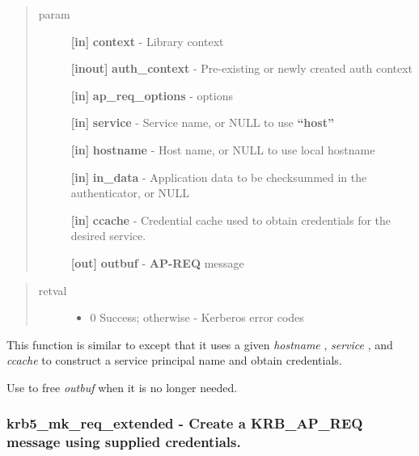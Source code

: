 \documentclass[letterpaper,10pt,english]{sphinxmanual}
\begin{document}
\begin{quote}\begin{description}
\item[{param}] \leavevmode
\textbf{{[}in{]}} \textbf{context} - Library context

\textbf{{[}inout{]}} \textbf{auth\_context} - Pre-existing or newly created auth context

\textbf{{[}in{]}} \textbf{ap\_req\_options} -  options

\textbf{{[}in{]}} \textbf{service} - Service name, or NULL to use \textbf{``host''}

\textbf{{[}in{]}} \textbf{hostname} - Host name, or NULL to use local hostname

\textbf{{[}in{]}} \textbf{in\_data} - Application data to be checksummed in the authenticator, or NULL

\textbf{{[}in{]}} \textbf{ccache} - Credential cache used to obtain credentials for the desired service.

\textbf{{[}out{]}} \textbf{outbuf} - \textbf{AP-REQ} message

\end{description}\end{quote}
\begin{quote}\begin{description}
\item[{retval}] \leavevmode\begin{itemize}
\item {} 
0   Success; otherwise - Kerberos error codes

\end{itemize}

\end{description}\end{quote}

This function is similar to {\hyperref[appdev/refs/api/krb5_mk_req_extended:krb5_mk_req_extended]{}} except that it uses a given \emph{hostname} , \emph{service} , and \emph{ccache} to construct a service principal name and obtain credentials.

Use {\hyperref[appdev/refs/api/krb5_free_data_contents:krb5_free_data_contents]{}} to free \emph{outbuf} when it is no longer needed.


\subsubsection{krb5\_mk\_req\_extended -  Create a KRB\_AP\_REQ message using supplied credentials.}
\label{appdev/refs/api/krb5_mk_req_extended::doc}\label{appdev/refs/api/krb5_mk_req_extended:krb5-mk-req-extended-create-a-krb-ap-req-message-using-supplied-credentials}
\end{document}
